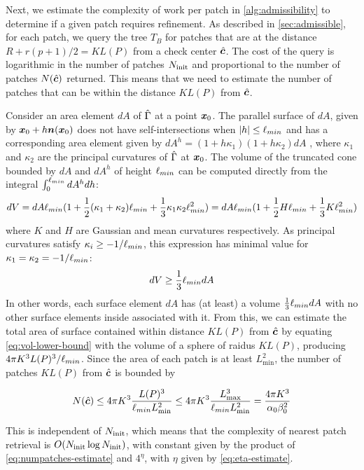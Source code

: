 Next, we estimate the complexity of work per patch in \cref{alg:admissibility} to determine if a given patch requires refinement. 
As described in \cref{sec:admissible}, for each patch, we query the \aabb tree $T_B$ for patches that are at the distance $R + r(p+1)/2 = K L(P)$ from a check center ${\hat{\bm{c}}}$.
The cost of the query is logarithmic in the number of patches $N_{\mathrm{init}}$ and proportional to the number of patches $N({\hat{\bm{c}}})$ returned.  
This means that we need to estimate the number of patches that can be within the distance $K L(P)$ from ${\hat{\bm{c}}}$.

Consider an area element $dA$ of $\hat{\Gamma}$ at a point ${\bm{x}}_0$. The parallel surface of $dA$,
given by ${\bm{x}}_0 + h {\bm{n}}({\bm{x}}_0)$ does not have self-intersections when $|h| \leq \ell_{min}$ and has a corresponding area element given by $dA^{h} = (1+ h \kappa_1)(1+h \kappa_2)dA$ \cite[Section 6.2]{K}, where $\kappa_1$ and $\kappa_2$ are the principal curvatures of $\hat{\Gamma}$ at ${\bm{x}}_0$.
The volume of the truncated cone bounded by $dA$ and $dA^{h}$ of height $\ell_{min}$ can be computed directly from the integral $\int_0^{\ell_{min}} dA^h dh$:
\[
  dV = dA \ell_{min} (1 + \frac{1}{2} (\kappa_1 + \kappa_2) \ell_{min} + \frac{1}{3} \kappa_1 \kappa_2 \ell_{min}^2)   = dA\ell_{min}(1 + \frac{1}{2} H \ell_{min} + \frac{1}{3} K \ell_{min}^2)
\]
where $K$ and $H$ are Gaussian and mean curvatures respectively. As principal curvatures satisfy
$\kappa_i \geq -1/\ell_{min}$,  this expression has minimal value for $\kappa_1 = \kappa_2 = -1/\ell_{min}$:
\begin{equation}
dV \geq \frac{1}{3}\ell_{min} dA
\label{eq:vol-lower-bound}
\end{equation}
In other words, each surface element $dA$ has (at least) a volume $\frac{1}{3}\ell_{min} dA$ with no other surface elements inside associated with it.  From this, we can estimate the total area of surface contained within distance $K L(P)$ from ${\hat{\bm{c}}}$ by equating \cref{eq:vol-lower-bound} with the volume of a sphere of raidus $KL(P)$, producing $4 \pi K^3 L(P)^3/\ell_{min}$.
Since the area of each patch is at least $L_{\min}^2$, the number of patches $KL(P)$ from ${\hat{\bm{c}}}$ is bounded by

\begin{equation}
  N({\hat{\bm{c}}}) \leq  4 \pi K^3 \frac{L(P)^3}{\ell_{min} L_{\mathrm{min}}^2} \leq 4 \pi K^3 \frac{L_{\mathrm{max}}^3}{\ell_{min} L_{\mathrm{min}}^2} =
  \frac{4 \pi K^3}{\alpha_0 \beta_0^2}
 \label{eq:numpatches-estimate}
 \end{equation}

This is independent of $N_{\mathrm{init}}$, which means that the complexity of nearest patch retrieval is $O( N_{\mathrm{init}} \log N_{\mathrm{init}})$, with constant given by the product of
\eqref{eq:numpatches-estimate} and $4^\eta$, with $\eta$ given by \eqref{eq:eta-estimate}.


